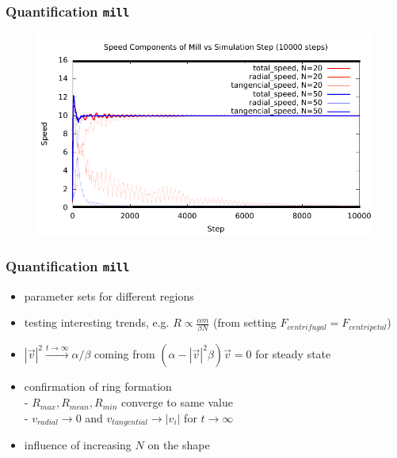 \documentclass[compress]{beamer}
\begin{document}
\begin{frame}
	\frametitle{Quantification \texttt{mill}}	
	\begin{figure}[H]
		\includegraphics[width=1. \columnwidth]{../plots/mill_II_speeds_dt_allN.pdf}
	\end{figure}	
\end{frame}




\begin{frame}
	\frametitle{Quantification \texttt{mill}}
	\begin{itemize}
		\item parameter sets for different regions
		\item testing interesting trends, e.g. \( R \propto \frac{\alpha m}{\beta N}\) (from setting \( F_{centrifugal} = F_{centripetal} \))
		\item \( |\vec{v}|^{2} \xrightarrow{t \to \infty}  \alpha / \beta \) coming from \( (\alpha - |\vec{v}|^2 \beta ) \vec{v} = 0 \) for steady state
		\item confirmation of ring formation \\
		- \( R_{max}, R_{mean}, R_{min} \) converge to same value \\
		- \( v_{radial} \to 0 \) and \( v_{tangential} \to | v_{i} |  \) for \( t \to \infty \)
		\item influence of increasing \( N \) on the shape
	\end{itemize}
\end{frame}
\end{document}
